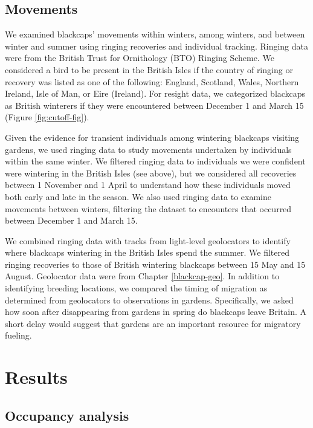 \documentclass[a4paper, nobind]{templates/ociamthesis}
\begin{document}
\hypertarget{movements}{%
\subsection{Movements}\label{movements}}

We examined blackcaps' movements within winters, among winters, and between winter and summer using ringing recoveries and individual tracking. Ringing data were from the British Trust for Ornithology (BTO) Ringing Scheme. We considered a bird to be present in the British Isles if the country of ringing or recovery was listed as one of the following: England, Scotland, Wales, Northern Ireland, Isle of Man, or Eire (Ireland). For resight data, we categorized blackcaps as British winterers if they were encountered between December 1 and March 15 (Figure \ref{fig:cutoff-fig}).

Given the evidence for transient individuals among wintering blackcaps visiting gardens, we used ringing data to study movements undertaken by individuals within the same winter. We filtered ringing data to individuals we were confident were wintering in the British Isles (see above), but we considered all recoveries between 1 November and 1 April to understand how these individuals moved both early and late in the season. We also used ringing data to examine movements between winters, filtering the dataset to encounters that occurred between December 1 and March 15.

We combined ringing data with tracks from light-level geolocators to identify where blackcaps wintering in the British Isles spend the summer. We filtered ringing recoveries to those of British wintering blackcaps between 15 May and 15 August. Geolocator data were from Chapter \ref{blackcap-geo}. In addition to identifying breeding locations, we compared the timing of migration as determined from geolocators to observations in gardens. Specifically, we asked how soon after disappearing from gardens in spring do blackcaps leave Britain. A short delay would suggest that gardens are an important resource for migratory fueling.

\hypertarget{results}{%
\section{Results}\label{results}}

\hypertarget{occupancy-analysis-1}{%
\subsection{Occupancy analysis}\label{occupancy-analysis-1}}
\end{document}
